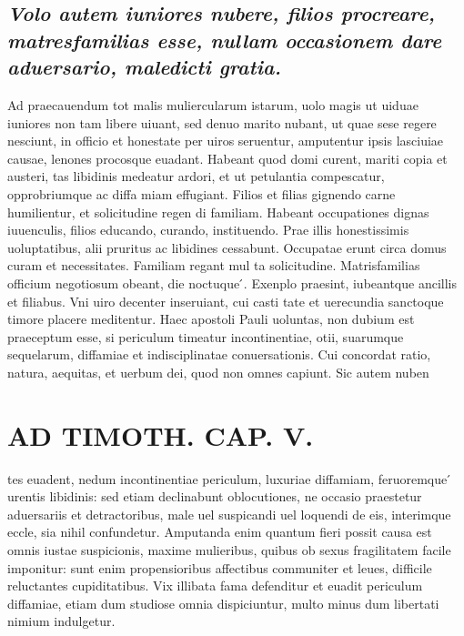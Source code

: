 \documentclass{article}
\begin{document}
\begin{pages}
\subsection*{\textit{Volo autem iuniores nubere, filios procreare, matresfamilias esse, nullam occasionem dare aduersario, maledicti gratia. }}\pstart Ad praecauendum tot malis muliercularum istarum, uolo magis ut uiduae iuniores non tam libere uiuant, sed denuo marito nubant, ut quae sese regere nesciunt, in officio et honestate per uiros seruentur, amputentur ipsis lasciuiae causae, lenones procosque euadant. Habeant quod domi curent, mariti copia et austeri, tas libidinis medeatur ardori, et ut petulantia compescatur, opprobriumque ac diffa miam effugiant. Filios et filias gignendo carne humilientur, et solicitudine regen di familiam. Habeant occupationes dignas iuuenculis, filios educando, curando, instituendo. Prae illis honestissimis uoluptatibus, alii pruritus ac libidines cessabunt. Occupatae erunt circa domus curam et necessitates. Familiam regant mul ta solicitudine. Matrisfamilias officium negotiosum obeant, die noctuque ́. Exenplo praesint, iubeantque ancillis et filiabus. Vni uiro decenter inseruiant, cui casti tate et uerecundia sanctoque timore placere meditentur. Haec apostoli Pauli uoluntas, non dubium est praeceptum esse, si periculum timeatur incontinentiae, otii, suarumque sequelarum, diffamiae et indisciplinatae conuersationis. Cui concordat ratio, natura, aequitas, et uerbum dei, quod non omnes capiunt. Sic autem nuben\pend
\section*{AD TIMOTH. CAP. V. }
\marginpar{[ p.521 ]}\pstart tes euadent, nedum incontinentiae periculum, luxuriae diffamiam, feruoremque ́ urentis libidinis: sed etiam declinabunt oblocutiones, ne occasio praestetur aduersariis et detractoribus, male uel suspicandi uel loquendi de eis, interimque eccle, sia nihil confundetur. Amputanda enim quantum fieri possit causa est omnis iustae suspicionis, maxime mulieribus, quibus ob sexus fragilitatem facile imponitur: sunt enim propensioribus affectibus communiter et leues, difficile reluctantes cupiditatibus. Vix illibata fama defenditur et euadit periculum diffamiae, etiam dum studiose omnia dispiciuntur, multo minus dum libertati nimium indulgetur.  \pend
{}
{}

\end{pages}
\end{document}
